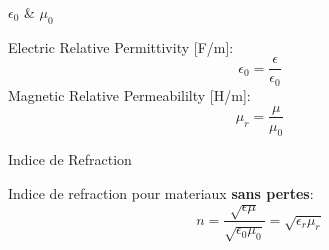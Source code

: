 \begin{frame}{$\epsilon_0$ \& $\mu_0$}
    \begin{twocolumns}[0.5]
        \leftcol
            Electric Relative Permittivity [F/m]:
            \begin{equation}
                \epsilon_0 =\frac{\epsilon}{\epsilon_0}
            \end{equation}
            Magnetic Relative Permeabililty [H/m]:
            \begin{equation}
                \mu_r =\frac{\mu}{\mu_0}
            \end{equation}
        \rightcol
    \end{twocolumns}
\end{frame}

\begin{frame}{Indice de Refraction}
    \begin{twocolumns}[0.5]
        \leftcol
            Indice de refraction pour materiaux \textbf{sans pertes}:
            \begin{equation}
                n =\frac{\sqrt{\epsilon \mu}}{\sqrt{\epsilon_0 \mu_0}} = \sqrt{\epsilon_r \mu_r}
            \end{equation}
        \rightcol
    \end{twocolumns}
\end{frame}


\begin{comment}
\subsection[4min - Max]{Charge Movement}
\begin{frame}{Plan}
    \begin{makelist}[\small][1.5]
        \icon[red]{\faTimes} & Comment les Electrons bougent\\
        \icon[red]{\faTimes} & Propriété materiaux
    \end{makelist}
\end{frame}

\begin{frame}{EM Properties of metals}
    \maketable{conductivity}
\end{frame}


\subsection[3min - Max]{Passive Components \rom{1}}
\begin{frame}{Plan}
    \begin{makelist}[\small][1.5]
        \icon[red]{\faTimes} & Resistance\\
        \icon[red]{\faTimes} & Condensateur \\
        \icon[red]{\faTimes} & Inducteur
    \end{makelist}
\end{frame}
\end{comment}